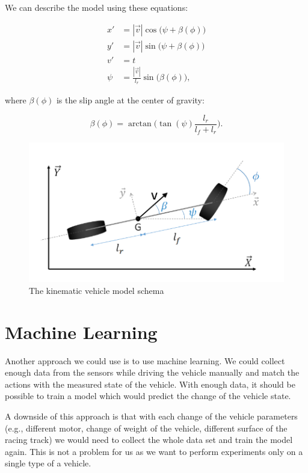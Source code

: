 We can describe the model using these equations:

\begin{align*}
    x' &= |\vec{v}|\cos\big(\psi + \beta(\phi)\big) \\
    y' &= |\vec{v}|\sin\big(\psi + \beta(\phi)\big) \\
    v' &= t \\
    \psi &= \frac{|\vec{v}|}{l_r}\sin\big(\beta(\phi)\big),
\end{align*}

where \(\beta(\phi)\) is the slip angle at the center of gravity:

\[
    \beta (\phi) = \arctan\Big(\tan(\psi)\frac{l_r}{l_f + l_r}\Big).
\]

\begin{figure}
    \includegraphics[width=\textwidth]{../img/bicycle-model.png}
    \centering
    \caption{The kinematic vehicle model schema \cite{bicycleModel}}
    \label{fig:bicycleModel}
\end{figure}

\section{Machine Learning}

Another approach we could use is to use machine learning. We could collect enough data from the sensors while driving the vehicle manually and match the actions with the measured state of the vehicle. With enough data, it should be possible to train a model which would predict the change of the vehicle state.

A downside of this approach is that with each change of the vehicle parameters (e.g., different motor, change of weight of the vehicle, different surface of the racing track) we would need to collect the whole data set and train the model again. This is not a problem for us as we want to perform experiments only on a single type of a vehicle.

